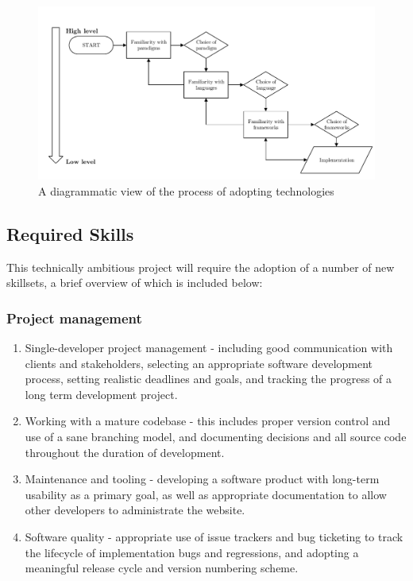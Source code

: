 \begin{figure}[H]
\centering
\includegraphics[width=7.2in]{assets/flow-tech-choices.pdf}
\caption{A diagrammatic view of the process of adopting technologies}
\label{fig:flow-tech-choices}
\end{figure}

\newpage
\subsection{Required Skills}
This technically ambitious project will require the adoption of a number of new
skillsets, a brief overview of which is included below:

\subsubsection{Project management}

\begin{enumerate}
\item Single-developer project management - including good communication with
  clients and stakeholders, selecting an appropriate software development
  process, setting realistic deadlines and goals, and tracking the progress of a
  long term development project.
\item Working with a mature codebase - this includes proper version control and
  use of a sane branching model, and documenting decisions and all source code
  throughout the duration of development.
\item Maintenance and tooling - developing a software product with long-term
  usability as a primary goal, as well as appropriate documentation to allow
  other developers to administrate the website.
\item Software quality - appropriate use of issue trackers and bug ticketing to
  track the lifecycle of implementation bugs and regressions, and adopting a
  meaningful release cycle and version numbering scheme.
\end{enumerate}

